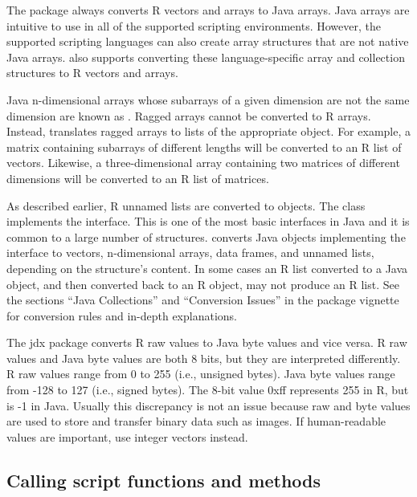 The  package always converts R vectors and arrays to Java arrays. Java arrays are intuitive to use in all of the supported scripting environments. However, the supported scripting languages can also create array structures that are not native Java arrays.  also supports converting these language-specific array and collection structures to R vectors and arrays.

Java n-dimensional arrays whose subarrays of a given dimension are not the same dimension are known as . Ragged arrays cannot be converted to R arrays. Instead,  translates ragged arrays to lists of the appropriate object. For example, a matrix containing subarrays of different lengths will be converted to an R list of vectors. Likewise, a three-dimensional array containing two matrices of different dimensions will be converted to an R list of matrices.

As described earlier, R unnamed lists are converted to \href{https://docs.oracle.com/javase/8/docs/api/java/util/ArrayList.html}{} objects. The  class implements the \href{https://docs.oracle.com/javase/8/docs/api/java/util/Collection.html}{} interface. This is one of the most basic interfaces in Java and it is common to a large number of structures.  converts Java objects implementing the  interface to vectors, n-dimensional arrays, data frames, and unnamed lists, depending on the structure's content. In some cases an R list converted to a Java object, and then converted back to an R object, may not produce an R list. See the sections ``Java Collections'' and ``Conversion Issues'' in the  package vignette for conversion rules and in-depth explanations.

The jdx package converts R raw values to Java byte values and vice versa. R raw values and Java byte values are both 8 bits, but they are interpreted differently. R raw values range from 0 to 255 (i.e., unsigned bytes). Java byte values range from -128 to 127 (i.e., signed bytes). The 8-bit value 0xff represents 255 in R, but is -1 in Java. Usually this discrepancy is not an issue because raw and byte values are used to store and transfer binary data such as images. If human-readable values are important, use integer vectors instead.

\subsection{Calling script functions and methods}

